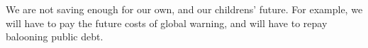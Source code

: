 We are not saving enough for our own, and our childrens' future.
For example, we will have to pay the future costs of global warning, and will have to repay balooning public debt.